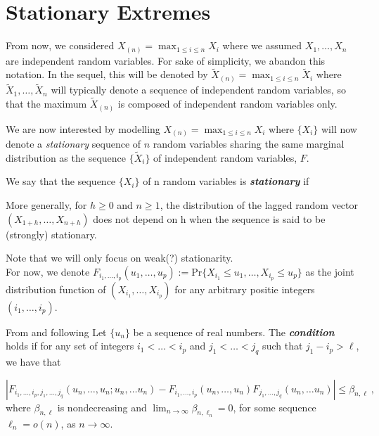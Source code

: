 \section{Stationary Extremes}\label{sec:statio}

From now, we considered $X_{(n)}=\max_{1\leq i\leq n}X_i$  where we assumed 
$X_1,\dots,X_n$  are independent random variables. For sake of simplicity, we abandon this 
notation. In the sequel, this will be denoted by $\tilde{X}_{(n)}=\max_{1\leq i\leq 
n}\tilde{X}_i$ where $\tilde{X}_1,\dots,\tilde{X}_n$ will typically denote a sequence of 
independent random variables, so that the maximum $\tilde{X}_{(n)}$ is composed of independent random variables only.

 We are now interested by modelling 
$X_{(n)}=\max_{1\leq i\leq n}X_i$ where $\{X_i\}$ will now denote a \emph{stationary} 
sequence of $n$ random variables sharing the same marginal distribution as the sequence $\{\tilde{X}_i\}$ of independent random variables, 
$F$.

\begin{definition}[Stationarity] We say that the sequence $\{X_i\}$ of n random variables is \emph{\textbf{stationary}} if 
	
	More generally, for $h\geq 0$ and $n\geq 1$, the distribution of the lagged random vector $(X_{1+h},\dots,X_{n+h})$ does not depend on h when the sequence is said to be (strongly) stationary.
\end{definition}
Note that we will only focus on weak(?) stationarity. \\



For now, we denote $F_{i_1,\dots,i_p}(u_1,\dots,u_p):=\text{Pr}\{X_{i_1}\leq 
u_1,\dots,X_{i_p}\leq u_p\}$ as the joint distribution function of 
$(X_{i_1},\dots,X_{i_p})$ for any arbitrary positie integers $(i_1,\dots,i_p)$.

\begin{definition} From \cite{leadbetter_extreme_1974}  and following \cite[pp.373-374, pp.93]{beirlant_statistics_2006,coles_introduction_2001}
	Let $\{u_n\}$ be a sequence of real numbers. The \emph{  \textbf{condition}} holds if for any set of integers $i_1<\dots<i_p$ and $j_1<\dots<j_q$ such that $j_1-i_p>\ell$, we have that 
	
	\begin{equation}
	|F_{i_1,\dots,i_p,j_1,\dots,j_q}(u_n,\dots,u_n;u_n,\dots u_n)-F_{i_1,\dots,i_p}(u_n,\dots,u_n)F_{j_1,\dots,j_q}(u_n,\dots u_n)|\leq \beta_{n,\ell}\ ,
	\end{equation}
	where $\beta_{n,\ell}$ is nondecreasing and  $\displaystyle{\lim_{n \to \infty}}\beta_{n,\ell_n}=0$, for some sequence $\ell_n=o(n)$, as $n\rightarrow\infty$.
\end{definition}

